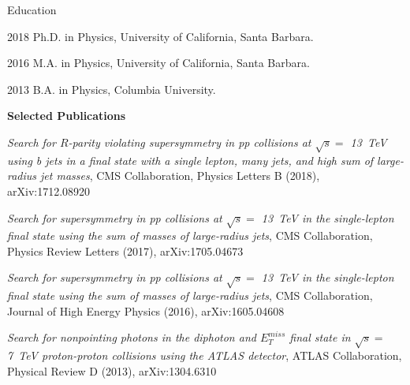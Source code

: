 \begin{vitae}

\begin{vitaesection}{Education}
\vspace{-0.1cm}
\item [2018]	Ph.D. in Physics, University of California, Santa Barbara.
\item [2016]	M.A. in Physics, University of California, Santa Barbara.
\item [2013]	B.A. in Physics, Columbia University.
\end{vitaesection}

\textbf{Selected Publications}

\textit{Search for $R$-parity violating supersymmetry in pp collisions at $\sqrt{s} =$ 13~TeV using b jets in a final state with a single lepton, many jets, and high sum of large-radius jet masses}, CMS Collaboration, Physics Letters B (2018), arXiv:1712.08920

\bigskip

\textit{Search for supersymmetry in pp collisions at $\sqrt{s} =$ 13~TeV in the single-lepton final state using the sum of masses of large-radius jets}, CMS Collaboration, Physics Review Letters (2017), arXiv:1705.04673

\bigskip

\textit{Search for supersymmetry in pp collisions at $\sqrt{s} =$ 13~TeV in the single-lepton final state using the sum of masses of large-radius jets}, CMS Collaboration, Journal of High Energy Physics (2016), arXiv:1605.04608

\bigskip

\textit{Search for nonpointing photons in the diphoton and $E_T^{miss}$ final state in $\sqrt{s} =$ 7~TeV proton-proton collisions using the ATLAS detector}, ATLAS Collaboration, Physical Review D (2013), arXiv:1304.6310

\end{vitae}
